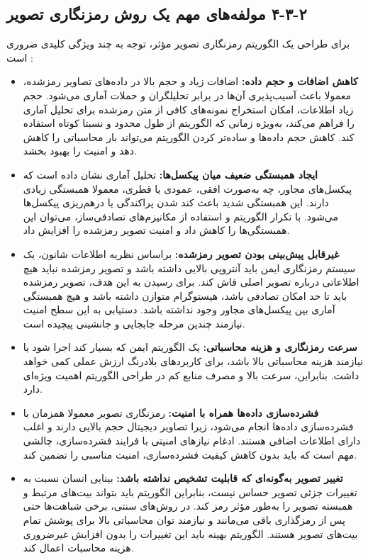 \subsection{‏۲‏-‏۳‏-‏۴‏ مولفه‌های مهم یک روش رمزنگاری تصویر}

برای طراحی یک الگوریتم رمزنگاری تصویر مؤثر، توجه به چند ویژگی کلیدی ضروری است \cite{ref44, ref45}:

\begin{itemize}
    \item \textbf{کاهش اضافات و حجم داده:} اضافات زیاد و حجم بالا در داده‌های تصاویر رمزشده، معمولا باعث آسیب‌پذیری آن‌ها در برابر تحلیلگران و حملات آماری می‌شود. حجم زیاد اطلاعات، امکان استخراج نمونه‌های کافی از متن رمزشده برای تحلیل آماری را فراهم می‌کند، به‌ویژه زمانی که الگوریتم از طول محدود و نسبتا کوتاه استفاده کند. کاهش حجم داده‌ها و ساده‌تر کردن الگوریتم می‌تواند بار محاسباتی را کاهش دهد و امنیت را بهبود بخشد.
    \item \textbf{ایجاد همبستگی ضعیف میان پیکسل‌ها:} تحلیل آماری نشان داده است که پیکسل‌های مجاور، چه به‌صورت افقی، عمودی یا قطری، معمولا همبستگی زیادی دارند. این همبستگی شدید باعث کند شدن پراکندگی یا درهم‌ریزی پیکسل‌ها می‌شود. با تکرار الگوریتم و استفاده از مکانیزم‌های تصادفی‌ساز، می‌توان این همبستگی‌ها را کاهش داد و امنیت تصویر رمزشده را افزایش داد.
    \item \textbf{غیرقابل پیش‌بینی بودن تصویر رمزشده:} براساس نظریه اطلاعات شانون، یک سیستم رمزنگاری ایمن باید آنتروپی بالایی داشته باشد و تصویر رمزشده نباید هیچ اطلاعاتی درباره تصویر اصلی فاش کند. برای رسیدن به این هدف، تصویر رمزشده باید تا حد امکان تصادفی باشد، هیستوگرام متوازن داشته باشد و هیچ همبستگی آماری بین پیکسل‌های مجاور وجود نداشته باشد. دستیابی به این سطح امنیت نیازمند چندین مرحله جابجایی و جانشینی پیچیده است.
    \item \textbf{سرعت رمزنگاری و هزینه محاسباتی:} یک الگوریتم ایمن که بسیار کند اجرا شود یا نیازمند هزینه محاسباتی بالا باشد، برای کاربردهای بلادرنگ ارزش عملی کمی خواهد داشت. بنابراین، سرعت بالا و مصرف منابع کم در طراحی الگوریتم اهمیت ویژه‌ای دارد.
    \item \textbf{فشرده‌سازی داده‌ها همراه با امنیت:} رمزنگاری تصویر معمولا همزمان با فشرده‌سازی داده‌ها انجام می‌شود، زیرا تصاویر دیجیتال حجم بالایی دارند و اغلب دارای اطلاعات اضافی هستند. ادغام نیازهای امنیتی با فرایند فشرده‌سازی، چالشی مهم است که باید بدون کاهش کیفیت فشرده‌سازی، امنیت مناسبی را تضمین کند.
    \item \textbf{تغییر تصویر به‌گونه‌ای که قابلیت تشخیص نداشته باشد:} بینایی انسان نسبت به تغییرات جزئی تصویر حساس نیست، بنابراین الگوریتم باید بتواند بیت‌های مرتبط و همبسته تصویر را به‌طور مؤثر رمز کند. در روش‌های سنتی، برخی شباهت‌ها حتی پس از رمزگذاری باقی می‌مانند و نیازمند توان محاسباتی بالا برای پوشش تمام بیت‌های تصویر هستند. الگوریتم بهینه باید این تغییرات را بدون افزایش غیرضروری هزینه محاسبات اعمال کند.
\end{itemize}

